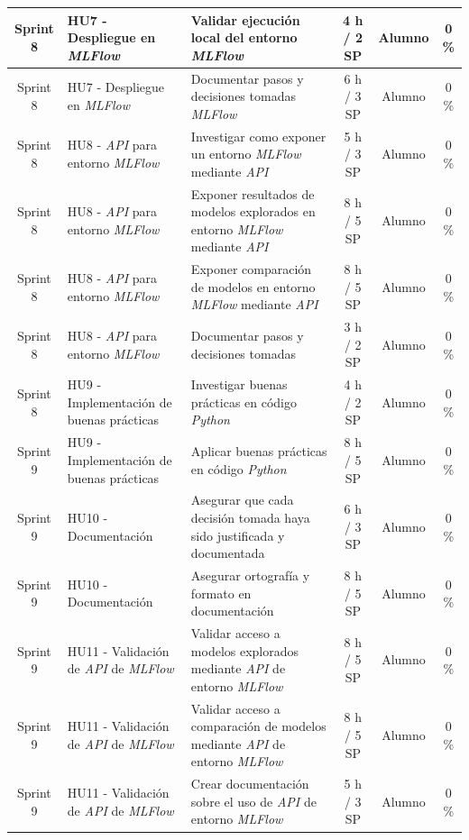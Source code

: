 \documentclass[
11pt, %
]{charter}
\begin{document}
\begin{xltabular}{\linewidth}{@{}|c|X|X|c|c|c|@{}}
Sprint 8 & HU7 - Despliegue en \textit{MLFlow}  & Validar ejecución local del entorno \textit{MLFlow}  & 4 h / 2 SP & Alumno & 0 \% \\ \hline
Sprint 8 & HU7 - Despliegue en \textit{MLFlow}  & Documentar pasos y decisiones tomadas \textit{MLFlow}  & 6 h / 3 SP & Alumno & 0 \% \\ \hline
Sprint 8 & HU8 - \textit{API} para entorno \textit{MLFlow} & Investigar como exponer un entorno \textit{MLFlow} mediante \textit{API}  & 5 h / 3 SP & Alumno & 0 \% \\ \hline
Sprint 8 & HU8 - \textit{API} para entorno \textit{MLFlow} & Exponer resultados de modelos explorados en entorno \textit{MLFlow} mediante \textit{API}  & 8 h / 5 SP & Alumno & 0 \%\\ \hline
Sprint 8 & HU8 - \textit{API} para entorno \textit{MLFlow} & Exponer comparación de modelos en entorno \textit{MLFlow} mediante \textit{API}  & 8 h / 5 SP & Alumno & 0 \%\\ \hline
Sprint 8 & HU8 - \textit{API} para entorno \textit{MLFlow} & Documentar pasos y decisiones tomadas  & 3 h / 2 SP & Alumno & 0 \%\\ \hline
Sprint 8 & HU9 - Implementación de buenas prácticas  & Investigar buenas prácticas en código \textit{Python}  & 4 h / 2 SP & Alumno & 0 \%\\ \hline
Sprint 9 & HU9 - Implementación de buenas prácticas  & Aplicar buenas prácticas en código \textit{Python}  & 8 h / 5 SP & Alumno & 0 \% \\ \hline
Sprint 9 & HU10 - Documentación  & Asegurar que cada decisión tomada haya sido justificada y documentada  & 6 h / 3 SP & Alumno & 0 \% \\ \hline
Sprint 9 & HU10 - Documentación  & Asegurar ortografía y formato en documentación  & 8 h / 5 SP & Alumno & 0 \% \\ \hline
Sprint 9 & HU11 - Validación de \textit{API} de \textit{MLFlow} & Validar acceso a modelos explorados mediante \textit{API} de entorno \textit{MLFlow}  & 8 h / 5 SP & Alumno & 0 \% \\ \hline
Sprint 9 & HU11 - Validación de \textit{API} de \textit{MLFlow} & Validar acceso a comparación de modelos mediante \textit{API} de entorno \textit{MLFlow}  & 8 h / 5 SP & Alumno & 0 \% \\ \hline
Sprint 9 & HU11 - Validación de \textit{API} de \textit{MLFlow} & Crear documentación sobre el uso de \textit{API} de entorno \textit{MLFlow}  & 5 h / 3 SP & Alumno & 0 \% \\ \hline

\end{xltabular}
\end{document}
